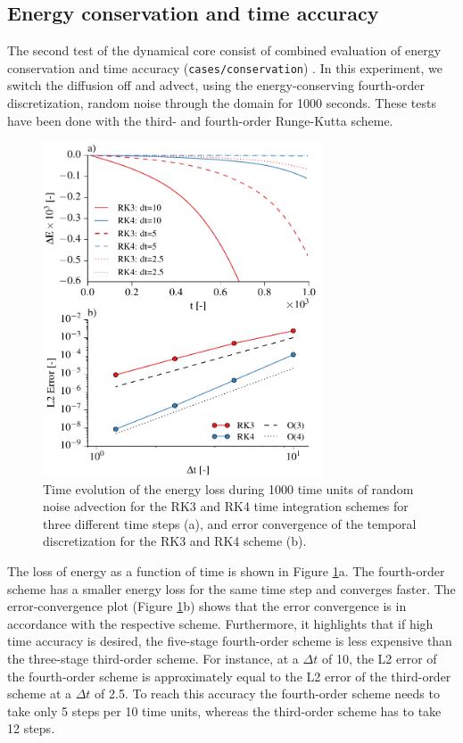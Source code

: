 \documentclass[gmd]{copernicus}
\begin{document}
\subsection{Energy conservation and time accuracy} \label{sec:validationtime}
The second test of the dynamical core consist of combined evaluation of energy conservation and time accuracy (\texttt{cases/conservation}) . In this experiment, we switch the diffusion off and advect, using the energy-conserving fourth-order discretization, random noise through the domain for 1000 seconds. These tests have been done with the third- and fourth-order Runge-Kutta scheme.
\begin{figure}[t]
\vspace*{2mm}
\begin{center}
\includegraphics[width=8.3cm]{figs/timeconvergence.pdf}
\end{center}
\caption{Time evolution of the energy loss during 1000 time units of random noise advection for the RK3 and RK4 time integration schemes for three different time steps (a), and error convergence of the temporal discretization for the RK3 and RK4 scheme (b).}\label{fig:timeconvergence}
\end{figure}

The loss of energy as a function of time is shown in Figure \ref{fig:timeconvergence}a. The fourth-order scheme has a smaller energy loss for the same time step and converges faster. The error-convergence plot (Figure \ref{fig:timeconvergence}b) shows that the error convergence is in accordance with the respective scheme. Furthermore, it highlights that if high time accuracy is desired, the five-stage fourth-order scheme is less expensive than the three-stage third-order scheme. For instance, at a $\Delta t$ of 10, the L2 error of the fourth-order scheme is approximately equal to the L2 error of the third-order scheme at a $\Delta t$ of 2.5. To reach this accuracy the fourth-order scheme needs to take only 5 steps per 10 time units, whereas the third-order scheme has to take 12 steps.
\end{document}
